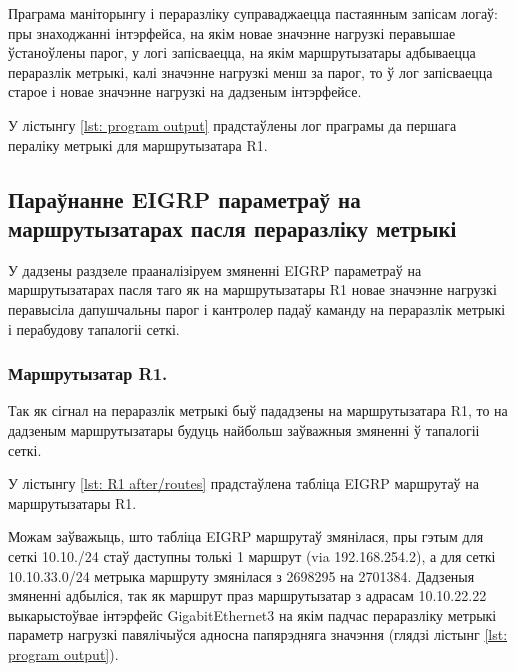 

Праграма маніторынгу і пераразліку суправаджаецца пастаянным
запісам логаў: пры знаходжанні інтэрфейса, на якім новае значэнне нагрузкі перавышае ўстаноўлены парог,
у логі запісваецца, на якім маршрутызатары адбываецца пераразлік метрыкі, калі значэнне нагрузкі менш за парог,
то ў лог запісваецца старое і новае значэнне нагрузкі на дадзеным інтэрфейсе.

У лістынгу \ref{lst: program output} прадстаўлены лог праграмы да першага пераліку метрыкі для маршрутызатара R1.



\subsection{Параўнанне EIGRP параметраў на маршрутызатарах пасля пераразліку метрыкі}

У дадзены раздзеле прааналізіруем змяненні EIGRP параметраў на маршрутызатарах пасля таго як
на маршрутызатары R1 новае значэнне нагрузкі перавысіла дапушчальны парог і кантролер падаў
каманду на пераразлік метрыкі і перабудову тапалогіі сеткі.

\subsubsection{Маршрутызатар R1.}

Так як сігнал на пераразлік метрыкі быў пададзены на маршрутызатара R1, то на дадзеным
маршрутызатары будуць найбольш заўважныя змяненні ў тапалогіі сеткі.

У лістынгу \ref{lst: R1 after/routes} прадстаўлена табліца EIGRP маршрутаў на маршрутызатары R1.



Можам заўважыць, што табліца EIGRP маршрутаў змянілася, пры гэтым
для сеткі 10.10./24 стаў даступны толькі 1 маршрут (via 192.168.254.2), а для сеткі 10.10.33.0/24 метрыка маршруту змянілася з 2698295 на 2701384.
Дадзеныя змяненні адбыліся, так як маршрут праз маршрутызатар з адрасам
10.10.22.22 выкарыстоўвае інтэрфейс GigabitEthernet3 на якім падчас пераразліку
метрыкі параметр нагрузкі павялічыўся адносна папярэдняга значэння (глядзі лістынг \ref{lst: program output}).

